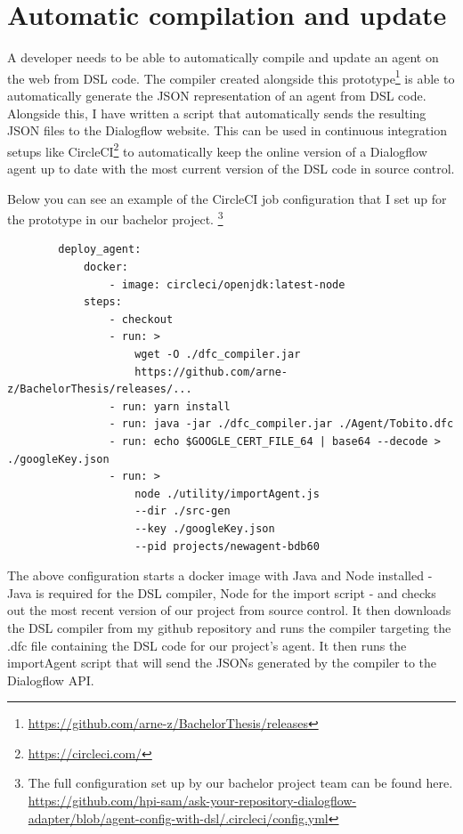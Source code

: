 \section{Automatic compilation and update}
A developer needs to be able to automatically compile and update an agent on the web from DSL code.
The compiler created alongside this prototype\footnote{\url{https://github.com/arne-z/BachelorThesis/releases}} is able to automatically generate the JSON representation of an agent from DSL code.
Alongside this, I have written a script that automatically sends the resulting JSON files to the Dialogflow website.
This can be used in continuous integration setups like CircleCI\footnote{\url{https://circleci.com/}} to automatically keep the online version of a Dialogflow agent up to date with the most current version of the DSL code in source control.

Below you can see an example of the CircleCI job configuration that I set up for the prototype in our bachelor project.
\footnote{The full configuration set up by our bachelor project team can be found here.\\
\url{https://github.com/hpi-sam/ask-your-repository-dialogflow-adapter/blob/agent-config-with-dsl/.circleci/config.yml}}
\begin{samepage}    
    \begin{verbatim}
        deploy_agent:
            docker:
                - image: circleci/openjdk:latest-node
            steps:
                - checkout
                - run: > 
                    wget -O ./dfc_compiler.jar
                    https://github.com/arne-z/BachelorThesis/releases/...
                - run: yarn install
                - run: java -jar ./dfc_compiler.jar ./Agent/Tobito.dfc
                - run: echo $GOOGLE_CERT_FILE_64 | base64 --decode > ./googleKey.json
                - run: >
                    node ./utility/importAgent.js 
                    --dir ./src-gen 
                    --key ./googleKey.json 
                    --pid projects/newagent-bdb60
    \end{verbatim}
\end{samepage}

The above configuration starts a docker image with Java and Node installed - Java is required for the DSL compiler, Node for the import script - and checks out the most recent version of our project from source control.
It then downloads the DSL compiler from my github repository and runs the compiler targeting the .dfc file containing the DSL code for our project's agent.
It then runs the importAgent script that will send the JSONs generated by the compiler to the Dialogflow API.

